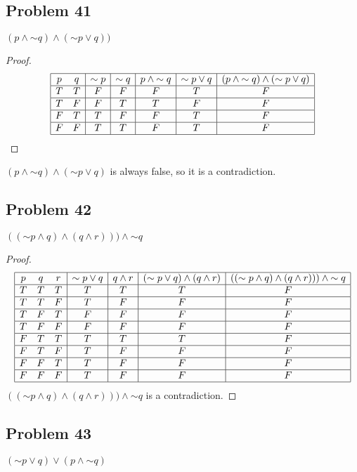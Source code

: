 \documentclass[14pt]{extarticle}
\begin{document}
\subsection{Problem 41}
$(p \wedge {\sim q}) \wedge ({\sim p} \vee q))$

\begin{proof}
$$
\begin{array}{|cc|c|c|c|c|c|}
\hline
p & q & {\sim p} & {\sim q} & p \wedge {\sim q} & {\sim p} \vee q &
(p \wedge {\sim q}) \wedge ({\sim p} \vee q) \\
\hline
T & T & F & F & F & T & F  \\
\hline
T & F & F & T & T & F & F  \\
\hline
F & T & T & F & F & T & F  \\
\hline
F & F & T & T & F & T & F  \\
\hline
\end{array}
$$
\end{proof}
$(p \wedge {\sim q}) \wedge ({\sim p} \vee q)$ is always false, so it is a
contradiction.


\subsection{Problem 42}
$(({\sim p} \wedge q) \wedge (q \wedge r))) \wedge {\sim q}$

\begin{proof}
$$
\begin{array}{|ccc|c|c|c|c|}
\hline
p & q & r & {\sim p} \vee q & q \wedge r & ({\sim p} \vee q) \wedge (q \wedge
r)& (({\sim p} \wedge q) \wedge (q \wedge r))) \wedge {\sim q} \\
\hline
T & T & T & T & T & T & F \\
\hline
T & T & F & T & F & F & F \\
\hline
T & F & T & F & F & F & F \\
\hline
T & F & F & F & F & F & F \\
\hline
F & T & T & T & T & T & F \\
\hline
F & T & F & T & F & F & F \\
\hline
F & F & T & T & F & F & F \\
\hline
F & F & F & T & F & F & F \\
\hline
\end{array}
$$
$(({\sim p} \wedge q) \wedge (q \wedge r))) \wedge {\sim q}$ is a contradiction.
\end{proof}

\subsection{Problem 43}
$({\sim p} \vee q) \vee (p \wedge {\sim q})$
\end{document}
